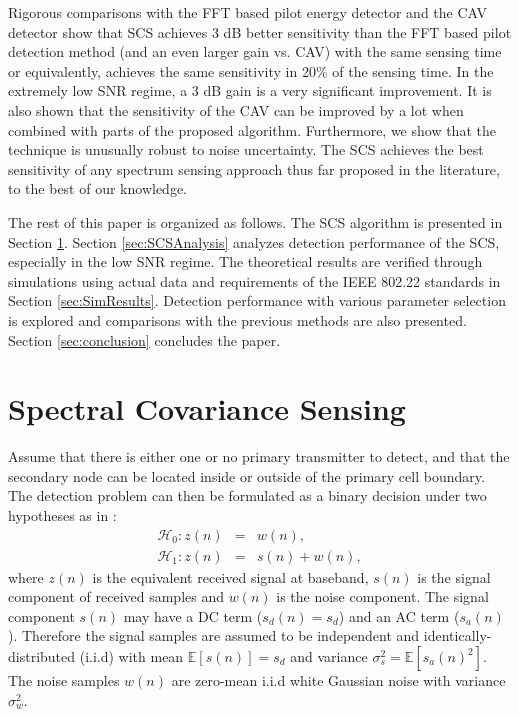\documentclass[draftclsnofoot,onecolumn,12pt]{IEEEtran}
\begin{document}
Rigorous comparisons with the FFT based pilot energy detector \cite{CorGho07} and the CAV detector \cite{ZenLia09} show that SCS achieves 3 dB better sensitivity than the FFT based pilot detection method (and an even larger gain vs. CAV) with the same sensing time or equivalently, achieves the same sensitivity in 20\% of the sensing time. In the extremely low SNR regime, a 3 dB gain is a very significant improvement.  It is also shown that the sensitivity of the CAV can be improved by a lot when combined with parts of the proposed algorithm.  Furthermore, we show that the technique is unusually robust to noise uncertainty. The SCS achieves the best sensitivity of any spectrum sensing approach thus far proposed in the literature, to the best of our knowledge.

The rest of this paper is organized as follows. The SCS algorithm is presented in Section \ref{sec:SensingAlgorithm}. Section \ref{sec:SCSAnalysis} analyzes detection performance of the SCS, especially in the low SNR regime. The theoretical results are verified through simulations using actual data and requirements of the IEEE 802.22 standards in Section \ref{sec:SimResults}. Detection performance with various parameter selection is explored and comparisons with the previous methods are also presented. Section \ref{sec:conclusion} concludes the paper.

\section{Spectral Covariance Sensing}
\label{sec:SensingAlgorithm}

Assume that there is either one or no primary transmitter to detect, and
that the secondary node can be located inside or outside of the primary cell boundary.
The detection problem can then be formulated as a binary decision under two hypotheses as in \cite{TanSah08,ZenLia09}:
\begin{eqnarray}
    \mathcal{H}_0: z(n) &=& w(n), \\
    \mathcal{H}_1: z(n) &=& s(n) + w(n),
\end{eqnarray}
where $z(n)$ is the equivalent received signal at baseband, $s(n)$ is the signal component of received samples and $w(n)$ is the noise component. The signal component $s(n)$ may have a DC term ($s_d(n) = s_d$) and an AC term ($s_a(n)$). Therefore the signal samples are assumed to be independent and identically-distributed (i.i.d) with mean $\mathbb{E}[s(n)] = s_d$ and variance $\sigma_s^2 = \mathbb{E}[s_a(n)^2]$.
The noise samples $w(n)$ are zero-mean i.i.d white Gaussian noise with variance $\sigma_w^2$.
\end{document}
